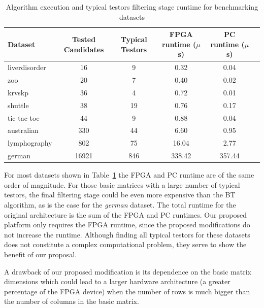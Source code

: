 \documentclass[authoryear,11pt]{elsarticle}
\begin{document}
	\begin{table}[htb]
	\caption{Algorithm execution and typical testors filtering stage runtime for benchmarking datasets}
	\label{tabTimes}
	\centering
	\begin{tabular}{lccccc}
	 	\hline                       
	  	Dataset & Tested Candidates & Typical Testors & FPGA runtime ($ \mu $s) & PC runtime ($ \mu $s)\\
	  	\hline
	  	liverdisorder& 16   & 9    & 0.32  & 0.04 \\
	  	zoo          & 20   & 7    & 0.40  & 0.02 \\
	  	krvskp       & 36   & 4    & 0.72  & 0.01 \\	  	
	  	shuttle      & 38   & 19   & 0.76  & 0.17 \\
	  	tic-tac-toe  & 44   & 9    & 0.88  & 0.04 \\
	  	australian   & 330  & 44   & 6.60  & 0.95 \\
	  	lymphography & 802  & 75   & 16.04 & 2.77 \\
	  	german       & 16921& 846  & 338.42& 357.44 \\
	 	\hline 
	\end{tabular}
	\end{table}
	
	For most datasets shown in Table~\ref{tabTimes} the FPGA and PC runtime are 
	of the same order of magnitude. For those basic matrices with a large number of typical testors, the final 
	filtering stage could be  even more expensive than the BT algorithm, as is the case for the \textit{german}
	dataset. The total runtime for the original architecture is the sum of the FPGA and PC runtimes. Our proposed
	platform only requires the FPGA runtime, since the proposed modifications do not increase the runtime.
	Although finding all typical testors for these datasets does not constitute a complex 
	computational problem, they serve to show the benefit of our proposal.
	
	A drawback of our proposed modification is its dependence on the basic matrix dimensions which could lead to a 
	larger hardware architecture (a greater percentage of the FPGA device) when the number of rows is much bigger 
	than the number of columns in the basic matrix. 
\end{document}
